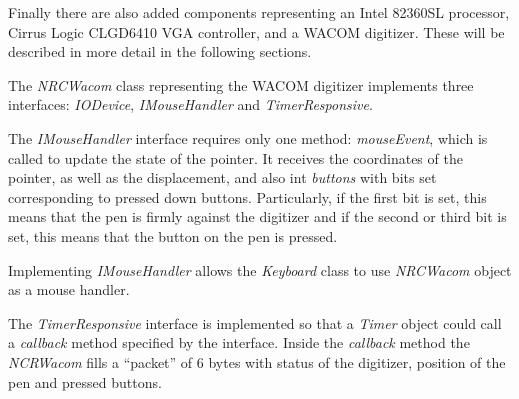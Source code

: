 Finally there are also added components representing an Intel 82360SL
processor, Cirrus Logic CLGD6410 VGA controller, and a WACOM digitizer. These
will be described in more detail in the following sections.


The \emph{NRCWacom} class representing the WACOM digitizer implements three
interfaces: \emph{IODevice}, \emph{IMouseHandler} and \emph{TimerResponsive}.

The \emph{IMouseHandler} interface requires only one method: \emph{mouseEvent},
which is called to update the state of the pointer. It receives the coordinates
of the pointer, as well as the displacement, and also int \emph{buttons} with
bits set corresponding to pressed down buttons. Particularly, if the first bit
is set, this means that the pen is firmly against the digitizer and if the second
or third bit is set, this means that the button on the pen is pressed.

\begin{codeblock}
    
\end{codeblock}


Implementing \emph{IMouseHandler} allows the \emph{Keyboard} class to use
\emph{NRCWacom} object as a mouse handler.

The \emph{TimerResponsive} interface is implemented so that a \emph{Timer}
object could call a \emph{callback} method specified by the interface. Inside
the \emph{callback} method the \emph{NCRWacom} fills a ``packet'' of 6 bytes
with status of the digitizer, position of the pen and pressed buttons.

